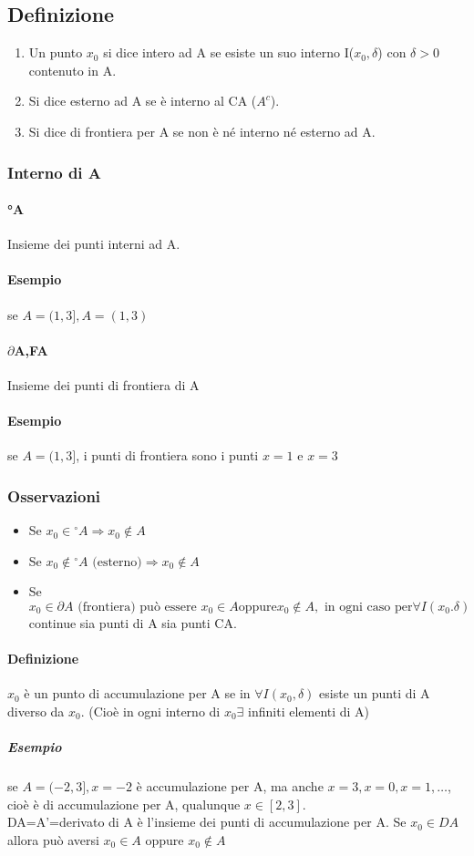 \documentclass{book}
\begin{document}
\subsection{Definizione}
\begin{enumerate}
	\item Un punto $x_0$ si dice intero ad A se esiste un suo interno I($x_0,\delta$)
con $\delta>0$ contenuto in A.
	\item Si dice esterno ad A se è interno al CA ($A^c$).
	\item Si dice di frontiera per A se non è né interno né esterno ad A.
\end{enumerate}
\subsubsection{Interno di A}
\paragraph{°A} Insieme dei punti interni ad A.
\paragraph{Esempio} se $A=(1,3], A=(1,3)$
\paragraph{$\partial$A,FA} Insieme dei punti di frontiera di A
\paragraph{Esempio} se $A=(1,3]$, i punti di frontiera sono i punti $x=1$ e
$x=3$
\subsubsection{Osservazioni}
\begin{itemize}
	\item Se $x_0\in {^\circ A}\Rightarrow x_0\notin A$
	\item Se $x_0\notin {^\circ A} \text{ (esterno)} \Rightarrow x_0\notin A$
	\item Se $x_0\in\partial A \text{ (frontiera) può essere }x_0\in A \text{
			oppure} x_0 \notin A, \text{ in ogni caso per} \forall
		I(x_0.\delta) $ continue sia punti di A sia punti CA.
\end{itemize}
\paragraph{Definizione}
$x_0$ è un punto di accumulazione per A se in $\forall I(x_0,\delta)$ esiste un
punti di A diverso da $x_0$. (Cioè in ogni interno di $x_0 \exists$ infiniti
elementi di A)
\subparagraph{Esempio} se $A=(-2,3],x=-2$ è accumulazione per A, ma anche
$x=3,x=0,x=1,\dots$, cioè è di accumulazione per A, qualunque $x\in [2,3]$.\\
DA=A'=derivato di A è l'insieme dei punti di accumulazione per A. Se $x_0\in
DA$ allora può aversi $x_0\in A$ oppure $x_0\notin A$
\end{document}
